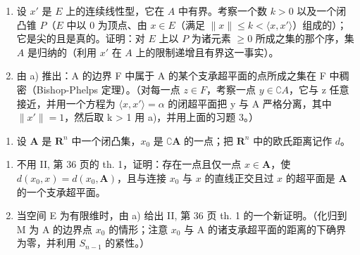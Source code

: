 \begin{enumerate}
\def\labelenumi{\alph{enumi})}
\item
  设 \(x'\) 是 \(E\) 上的连续线性型，它在 \(A\) 中有界。考察一个数 \(k > 0\) 以及一个闭凸锥 \(P\)（\(E\) 中以 0 为顶点、由 \(x \in E\)（满足 \(\| x \| \leqslant k < \langle x, x' \rangle\)）组成的）；它是尖的且是真的。证明：对 \(E\) 上以 \(P\) 为诸元素 \(\geqslant 0\) 所成之集的那个序，集 \(A\) 是归纳的（利用 \(x'\) 在 \(A\) 上的限制递增且有界这一事实）。
\item
  由 a) 推出：A 的边界 F 中属于 A 的某个支承超平面的点所成之集在 F 中稠密（Bishop-Phelps 定理）。（对每一点 \(z \in F\)，考察一点 \(y \in \complement A\)，它与 z 任意接近，并用一个方程为 \(\langle x, x' \rangle = \alpha\) 的闭超平面把 y 与 A 严格分离，其中 \(\|x' \| = 1\)，然后取 k > 1 用 a)，并用上面的习题 3。）
\end{enumerate}

\begin{enumerate}
\def\labelenumi{\arabic{enumi})}
\setcounter{enumi}{4}
\tightlist
\item
  设 \(\mathbf{A}\) 是 \(\mathbf{R}^n\) 中一个闭凸集，\(x_0\) 是 \(\complement \mathbf{A}\) 的一点；把 \(\mathbf{R}^n\) 中的欧氏距离记作 \(d\)。
\end{enumerate}

\begin{enumerate}
\def\labelenumi{\alph{enumi})}
\item
  不用 II, 第 36 页的 th. 1，证明：存在一点且仅一点 \(x \in \mathbf{A}\)，使 \(d(x_0, x) = d(x_0, \mathbf{A})\)，且与连接 \(x_0\) 与 \(x\) 的直线正交且过 \(x\) 的超平面是 \(\mathbf{A}\) 的一个支承超平面。
\item
  当空间 E 为有限维时，由 a) 给出 II, 第 36 页 th. 1 的一个新证明。（化归到 M 为 A 的边界点 \(x_{0}\) 的情形；注意 \(x_{0}\) 与 A 的诸支承超平面的距离的下确界为零，并利用 \(S_{n-1}\) 的紧性。）
\end{enumerate}

